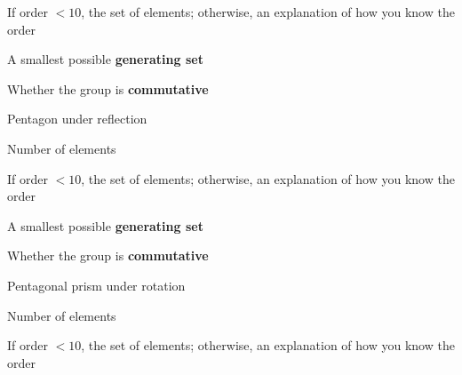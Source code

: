 \documentclass[../gatm_answers.tex]{subfiles}
\begin{document}
\begin{inner_problem}
\item If order $< 10$, the set of elements; otherwise, an explanation of how you know the order
\end{inner_problem}

\begin{inner_problem}
\item A smallest possible \textbf{generating set}
\end{inner_problem}

\begin{inner_problem}
\item Whether the group is \textbf{commutative}
\end{inner_problem}

\begin{outer_problem}
\item Pentagon under reflection
\end{outer_problem}

\begin{inner_problem}[start=1]
\item Number of elements
\end{inner_problem}

\begin{inner_problem}
\item If order $< 10$, the set of elements; otherwise, an explanation of how you know the order
\end{inner_problem}

\begin{inner_problem}
\item A smallest possible \textbf{generating set}
\end{inner_problem}

\begin{inner_problem}
\item Whether the group is \textbf{commutative}
\end{inner_problem}

\begin{outer_problem}
\item Pentagonal prism under rotation
\end{outer_problem}

\begin{inner_problem}[start=1]
\item Number of elements
\end{inner_problem}

\begin{inner_problem}
\item If order $< 10$, the set of elements; otherwise, an explanation of how you know the order
\end{inner_problem}
\end{document}
